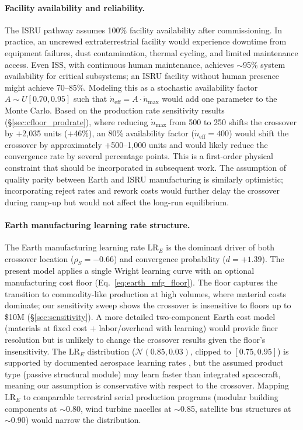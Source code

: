 \documentclass[preprint,12pt]{elsarticle}
\begin{document}
\paragraph{Facility availability and reliability.} The ISRU pathway assumes 100\% facility availability after commissioning. In practice, an uncrewed extraterrestrial facility would experience downtime from equipment failures, dust contamination, thermal cycling, and limited maintenance access. Even ISS, with continuous human maintenance, achieves $\sim$95\% system availability for critical subsystems; an ISRU facility without human presence might achieve 70--85\%. Modeling this as a stochastic availability factor $A \sim U[0.70, 0.95]$ such that $\dot{n}_{\mathrm{eff}} = A \cdot \dot{n}_{\max}$ would add one parameter to the Monte Carlo. Based on the production rate sensitivity results (\S\ref{sec:cfloor_prodrate}), where reducing $\dot{n}_{\max}$ from 500 to 250 shifts the crossover by $+$2{,}035 units ($+$46\%), an 80\% availability factor ($\dot{n}_{\mathrm{eff}} = 400$) would shift the crossover by approximately $+$500--1{,}000 units and would likely reduce the convergence rate by several percentage points. This is a first-order physical constraint that should be incorporated in subsequent work. The assumption of quality parity between Earth and ISRU manufacturing is similarly optimistic; incorporating reject rates and rework costs would further delay the crossover during ramp-up but would not affect the long-run equilibrium.

\paragraph{Earth manufacturing learning rate structure.} The Earth manufacturing learning rate LR$_E$ is the dominant driver of both crossover location ($\rho_S = -0.66$) and convergence probability ($d = +1.39$). The present model applies a single Wright learning curve with an optional manufacturing cost floor (Eq.~\ref{eq:earth_mfg_floor}). The floor captures the transition to commodity-like production at high volumes, where material costs dominate; our sensitivity sweep shows the crossover is insensitive to floors up to \$10M (\S\ref{sec:sensitivity}). A more detailed two-component Earth cost model (materials at fixed cost $+$ labor/overhead with learning) would provide finer resolution but is unlikely to change the crossover results given the floor's insensitivity. The LR$_E$ distribution ($\mathcal{N}(0.85, 0.03)$, clipped to $[0.75, 0.95]$) is supported by documented aerospace learning rates \cite{wertz2011}, but the assumed product type (passive structural module) may learn faster than integrated spacecraft, meaning our assumption is conservative with respect to the crossover. Mapping LR$_E$ to comparable terrestrial serial production programs (modular building components at $\sim$0.80, wind turbine nacelles at $\sim$0.85, satellite bus structures at $\sim$0.90) would narrow the distribution.
\end{document}
